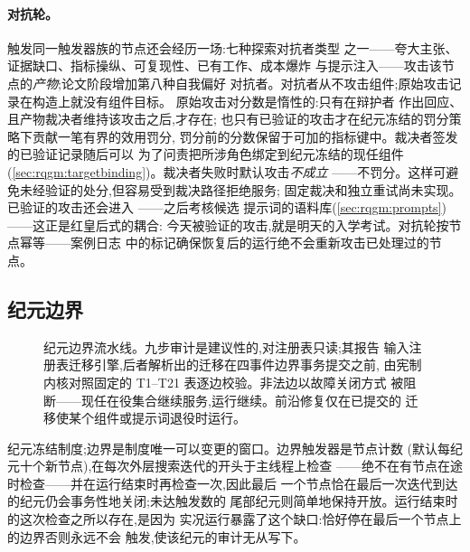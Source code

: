\paragraph{对抗轮。}
触发同一触发器族的节点还会经历一场:七种探索对抗者类型
之一——夸大主张、证据缺口、指标操纵、可复现性、已有工作、成本爆炸
与提示注入——攻击该节点的\emph{产物};论文阶段增加第八种自我偏好
对抗者。对抗者从不攻击组件;原始攻击记录在构造上就没有组件目标。
原始攻击对分数是惰性的:只有在辩护者
作出回应、且产物裁决者维持该攻击之后,才存在;
也只有已验证的攻击才在纪元冻结的罚分策略下贡献一笔有界的效用罚分,
罚分前的分数保留于可加的指标键中。裁决者签发的已验证记录随后可以
为了问责把所涉角色绑定到纪元冻结的现任组件
(\cref{sec:rqgm:targetbinding})。裁决者失败时默认攻击\emph{不成立}
——不罚分。这样可避免未经验证的处分,但容易受到裁决路径拒绝服务;
固定裁决和独立重试尚未实现。已验证的攻击还会进入
——之后考核候选
提示词的语料库(\cref{sec:rqgm:prompts})——这正是红皇后式的耦合:
今天被验证的攻击,就是明天的入学考试。对抗轮按节点幂等——案例日志
中的标记确保恢复后的运行绝不会重新攻击已处理过的节点。

\subsection{纪元边界}\label{sec:rqgm:boundary}

\begin{figure}[t]
  \centering
  \resizebox{\columnwidth}{!}{}
  \caption{纪元边界流水线。九步审计是建议性的,对注册表只读;其报告
    输入注册表迁移引擎,后者解析出的迁移在四事件边界事务提交之前,
    由宪制内核对照固定的 T1--T21 表逐边校验。非法边以故障关闭方式
    被阻断——现任在役集合继续服务,运行继续。前沿修复仅在已提交的
    迁移使某个组件或提示词退役时运行。}
  \label{fig:rqgm-boundary}
\end{figure}

纪元冻结制度;边界是制度唯一可以变更的窗口。边界触发器是节点计数
(默认每纪元十个新节点),在每次外层搜索迭代的开头于主线程上检查
——绝不在有节点在途时检查——并在运行结束时再检查一次,因此最后
一个节点恰在最后一次迭代到达的纪元仍会事务性地关闭;未达触发数的
尾部纪元则简单地保持开放。运行结束时的这次检查之所以存在,是因为
实况运行暴露了这个缺口:恰好停在最后一个节点上的边界否则永远不会
触发,使该纪元的审计无从写下。


